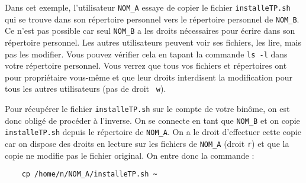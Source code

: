 \documentclass[10pt]{article}
\begin{document}
\begin{enumerate}[label=\textbf{[\alph*]},resume]
  \setlength\itemsep{1em}

\item Dans cet exemple, l'utilisateur {\tt NOM\_A} essaye de copier le
  fichier {\tt installeTP.sh} qui se trouve dans son répertoire
  personnel vers le répertoire personnel de {\tt NOM\_B}. Ce n'est pas
  possible car seul {\tt NOM\_B} a les droits nécessaires pour écrire
  dans son répertoire personnel. Les autres utilisateurs peuvent voir
  ses fichiers, les lire, mais pas les modifier. Vous pouvez vérifier
  cela en tapant la commande {\tt ls -l} dans votre répertoire
  personnel. Vous verrez que tous vos fichiers et répertoires ont pour
  propriétaire vous-même et que leur droits interdisent la
  modification pour tous les autres utilisateurs (pas de droit {\tt
    w}).

\item Pour récupérer le fichier {\tt installeTP.sh} sur le compte de
  votre binôme, on est donc obligé de procéder à l'inverse. On se
  connecte en tant que {\tt NOM\_B} et on copie {\tt installeTP.sh}
  depuis le répertoire de {\tt NOM\_A}. On a le droit d'effectuer
  cette copie car on dispose des droits en lecture sur les fichiers de
  {\tt NOM\_A} (droit {\tt r}) et que la copie ne modifie pas le
  fichier original. On entre donc la commande :

\begin{verbatim}
    cp /home/n/NOM_A/installeTP.sh ~
\end{verbatim}


\end{enumerate}
\end{document}
